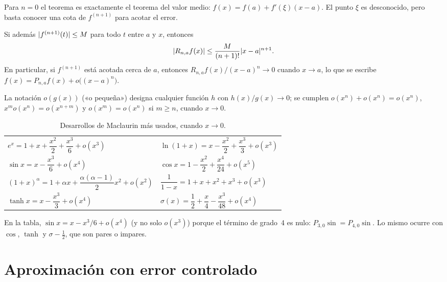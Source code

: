 Para $n=0$ el teorema es exactamente el teorema del valor medio: $f(x)=f(a)+f'(\xi)(x-a)$. El punto $\xi$ es desconocido, pero basta conocer una cota de $f^{(n+1)}$ para acotar el error.

\begin{corolario}\label{cor:cota}
Si además $\lvert f^{(n+1)}(t)\rvert\le M$ para todo $t$ entre $a$ y $x$, entonces
\[
\lvert R_{n,a}f(x)\rvert\le\frac{M}{(n+1)!}\lvert x-a\rvert^{n+1}.
\]
En particular, si $f^{(n+1)}$ está acotada cerca de $a$, entonces $R_{n,a}f(x)/(x-a)^{n}\to0$ cuando $x\to a$, lo que se escribe $f(x)=P_{n,a}f(x)+o\bigl((x-a)^{n}\bigr)$.
\end{corolario}

La notación $o(g(x))$ («o pequeña») designa cualquier función $h$ con $h(x)/g(x)\to0$; se cumplen $o(x^{n})+o(x^{n})=o(x^{n})$, $x^{m}o(x^{n})=o(x^{n+m})$ y $o(x^{m})=o(x^{n})$ si $m\ge n$, cuando $x\to0$.

\begin{table}[h]
\centering\small
\caption{Desarrollos de Maclaurin más usados, cuando $x\to0$.}\label{tab:maclaurin}
\begin{tabular}{@{}ll@{}}
\toprule
$e^{x}=1+x+\dfrac{x^{2}}{2}+\dfrac{x^{3}}{6}+o(x^{3})$ & $\ln(1+x)=x-\dfrac{x^{2}}{2}+\dfrac{x^{3}}{3}+o(x^{3})$ \\[2mm]
$\sin x=x-\dfrac{x^{3}}{6}+o(x^{4})$ & $\cos x=1-\dfrac{x^{2}}{2}+\dfrac{x^{4}}{24}+o(x^{5})$ \\[2mm]
$(1+x)^{\alpha}=1+\alpha x+\dfrac{\alpha(\alpha-1)}{2}x^{2}+o(x^{2})$ & $\dfrac{1}{1-x}=1+x+x^{2}+x^{3}+o(x^{3})$ \\[2mm]
$\tanh x=x-\dfrac{x^{3}}{3}+o(x^{4})$ & $\sigma(x)=\dfrac12+\dfrac{x}{4}-\dfrac{x^{3}}{48}+o(x^{4})$ \\
\bottomrule
\end{tabular}
\end{table}

En la tabla, $\sin x=x-x^{3}/6+o(x^{4})$ (y no solo $o(x^{3})$) porque el término de grado~4 es nulo: $P_{3,0}\sin=P_{4,0}\sin$. Lo mismo ocurre con $\cos$, $\tanh$ y $\sigma-\tfrac12$, que son pares o impares.

\addtocounter{definicion}{1}%

\section{Aproximación con error controlado}

\addtocounter{definicion}{1}%

